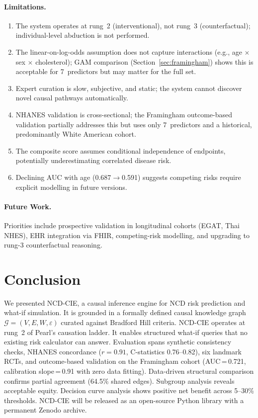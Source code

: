 \documentclass[runningheads]{llncs}
\begin{document}
\paragraph{Limitations.}
\begin{enumerate}
\item The system operates at rung~2 (interventional), not rung~3
  (counterfactual); individual-level abduction is not performed.
\item The linear-on-log-odds assumption does not capture interactions
  (e.g., age $\times$ sex $\times$ cholesterol); GAM comparison
  (Section~\ref{sec:framingham}) shows this is acceptable for
  7~predictors but may matter for the full set.
\item Expert curation is slow, subjective, and static; the system
  cannot discover novel causal pathways automatically.
\item NHANES validation is cross-sectional; the Framingham
  outcome-based validation partially addresses this but uses only
  7~predictors and a historical, predominantly White American cohort.
\item The composite score assumes conditional independence of
  endpoints, potentially underestimating correlated disease risk.
\item Declining AUC with age (0.687$\rightarrow$0.591) suggests
  competing risks require explicit modelling in future versions.
\end{enumerate}

\paragraph{Future Work.}
Priorities include prospective validation in longitudinal cohorts
(EGAT, Thai NHES), EHR integration via FHIR, competing-risk
modelling, and upgrading to rung-3 counterfactual reasoning.

\section{Conclusion}\label{sec:conclusion}

We presented NCD-CIE, a causal inference engine for NCD risk
prediction and what-if simulation.
It is grounded in a formally defined causal knowledge graph
$\mathcal{G} = (V, E, W, \varepsilon)$ curated against Bradford Hill
criteria.
NCD-CIE operates at rung~2 of Pearl's causation ladder.
It enables structured what-if queries that no existing risk
calculator can answer.
Evaluation spans synthetic consistency checks, NHANES concordance
($r = 0.91$, C-statistics 0.76--0.82), six landmark RCTs, and
outcome-based validation on the Framingham cohort
(AUC\,=\,0.721, calibration slope\,=\,0.91 with zero data fitting).
Data-driven structural comparison confirms partial agreement
(64.5\% shared edges).
Subgroup analysis reveals acceptable equity.
Decision curve analysis shows positive net benefit across 5--30\%
thresholds.
NCD-CIE will be released as an open-source Python library with a
permanent Zenodo archive.
\end{document}
